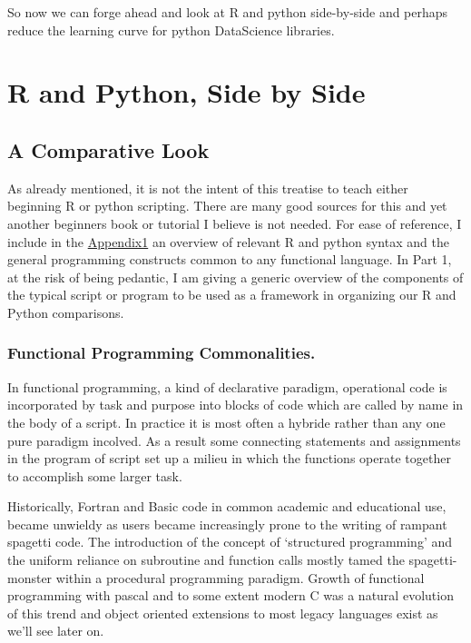 \documentclass[]{book}
\theoremstyle{definition}
\theoremstyle{definition}
\theoremstyle{definition}
\theoremstyle{remark}
\begin{document}
So now we can forge ahead and look at R and python side-by-side and
perhaps reduce the learning curve for python 
DataScience libraries.

\part{R and Python, Side by
Side}\label{part-r-and-python-side-by-side}

\chapter{A Comparative Look}\label{a-comparative-look}

As already mentioned, it is not the intent of this treatise to teach
either beginning R or python scripting. There are many good sources for
this and yet another beginners book or tutorial I believe is not needed.
For ease of reference, I include in the \href{Appendix_1.md}{Appendix1}
an overview of relevant R and python syntax and the general programming
constructs common to any functional language. In Part 1, at the risk of
being pedantic, I am giving a generic overview of the components of the
typical script or program to be used as a framework in organizing our R
and Python comparisons.

\section{Functional Programming
Commonalities.}\label{functional-programming-commonalities.}

In functional programming, a kind of declarative paradigm, operational
code is incorporated by task and purpose into blocks of code which are
called by name in the body of a script. In practice it is most often a
hybride rather than any one pure paradigm incolved. As a result some
connecting statements and assignments in the program of script set up a
milieu in which the functions operate together to accomplish some larger
task.

Historically, Fortran and Basic code in common academic and educational
use, became unwieldy as users became increasingly prone to the writing
of rampant spagetti code. The introduction of the concept of `structured
programming' and the uniform reliance on subroutine and function calls
mostly tamed the spagetti-monster within a procedural programming
paradigm. Growth of functional programming with pascal and to some
extent modern C was a natural evolution of this trend and object
oriented extensions to most legacy languages exist as we'll see later
on.
\end{document}
